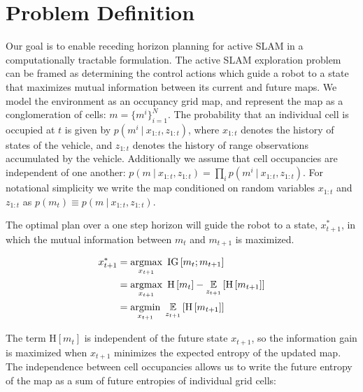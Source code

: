 \section{Problem Definition}

Our goal is to enable receding horizon planning for active SLAM in a computationally tractable formulation. The active SLAM exploration problem can be framed as determining the control actions which guide a robot to a state that maximizes mutual information between its current and future maps. We model the environment as an occupancy grid map, and represent the map as a conglomeration of cells: $m = \{m^{i}\}_{i=1}^{N}$. The probability that an individual cell is occupied at $t$ is given by $p\left(m^{i} \ \vert \ x_{1:t}, z_{1:t}\right)$, where $x_{1:t}$ denotes the history of states of the vehicle, and $z_{1:t}$ denotes the history of range observations accumulated by the vehicle. Additionally we assume that cell occupancies  are independent of one another: $p\left(m \ \vert \ x_{1:t}, z_{1:t}\right) = \prod_{i} p\left(m^{i} \ \vert \ x_{1:t}, z_{1:t}\right)$. For notational simplicity we write the map conditioned on random variables $x_{1:t}$ and $z_{1:t}$ as $p\left(m_{t}\right) \equiv p\left(m \ \vert \ x_{1:t}, z_{1:t}\right)$.

The optimal plan over a one step horizon will guide the robot to a state, $x_{t+1}^{*}$, in which the mutual information between $m_{t}$ and $m_{t+1}$ is maximized.

\begin{align} \begin{split}
    x_{t+1}^{*}
    &=
    \argmax_{x_{t+1}}
    \
    \text{IG}\left[
        m_{t}
        ;
        m_{t+1}
    \right]
    \\
    &=
    \argmax_{x_{t+1}}
    \
    \text{H}\left[
        m_{t}
    \right]
    -
    \expect_{z_{t+1}}\left[
        \text{H}\left[
            m_{t+1}
        \right]
    \right]
    \\
    &=
    \argmin_{x_{t+1}}
    \
    \expect_{z_{t+1}}\left[
        \text{H}\left[
            m_{t+1}
        \right]
    \right]
\end{split} \end{align}

The term $\text{H}\left[m_{t}\right]$ is independent of the future state $x_{t+1}$, so the information gain is maximized when $x_{t+1}$ minimizes the expected entropy of the updated map. The independence between cell occupancies allows us to write the future entropy of the map as a sum of future entropies of individual grid cells:

